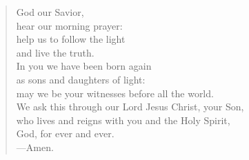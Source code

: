 \prayer

\setlength{\vleftmargin}{\prayerleftmargini}

\begin{verse}
God our Savior,\\
hear our morning prayer:\\
help us to follow the light\\
and live the truth.\\
In you we have been born again\\
as sons and daughters of light:\\
may we be your witnesses before all the world.\\
We ask this through our Lord Jesus Christ, your Son,\\
who lives and reigns with you and the Holy Spirit,\\
God, for ever and ever.\\
{\color{red}---\thinspace}Amen.
\end{verse}

\setlength{\vleftmargin}{\defleftmargini}